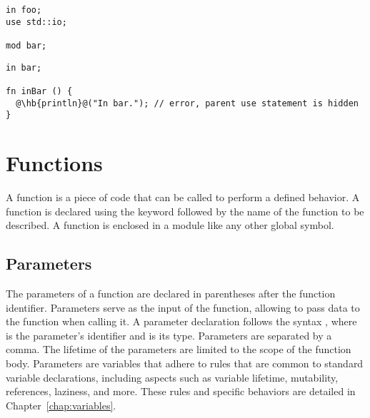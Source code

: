 \hspace{-0.03\linewidth}%
\begin{minipage}[t][][t]{0.3\linewidth}%
\begin{lstlisting}[caption=\textit{./foo.yr}, style=coloredverbatim]
in foo;
use std::io;

mod bar;
\end{lstlisting}
\end{minipage}%
\hspace{0.02\linewidth}%
\begin{minipage}[t][][t]{0.65\linewidth}
\begin{lstlisting}[caption=\textit{./foo/bar.yr}, style=coloredverbatim, escapechar=@]
in bar;

fn inBar () {
  @\hb{println}@("In bar."); // error, parent use statement is hidden
}
\end{lstlisting}
\end{minipage}%

\vfill%
\pagebreak

\section{Functions}%
\label{sec:functions}

A function is a piece of code that can be called to perform a defined behavior.
A function is declared using the keyword  followed by the name of the
function to be described. A function is enclosed in a module like any other
global symbol.

\subsection{Parameters}
\label{sec:function_parameters}

The parameters of a function are declared in parentheses after the function
identifier. Parameters serve as the input of the function, allowing to pass data
to the function when calling it. A parameter declaration follows the syntax
, where  is the parameter's identifier and
 is its type. Parameters are separated by a comma. The lifetime of the
parameters are limited to the scope of the function body. Parameters are
variables that adhere to rules that are common to standard variable
declarations, including aspects such as variable lifetime, mutability,
references, laziness, and more. These rules and specific behaviors are detailed
in Chapter~\ref{chap:variables}.


